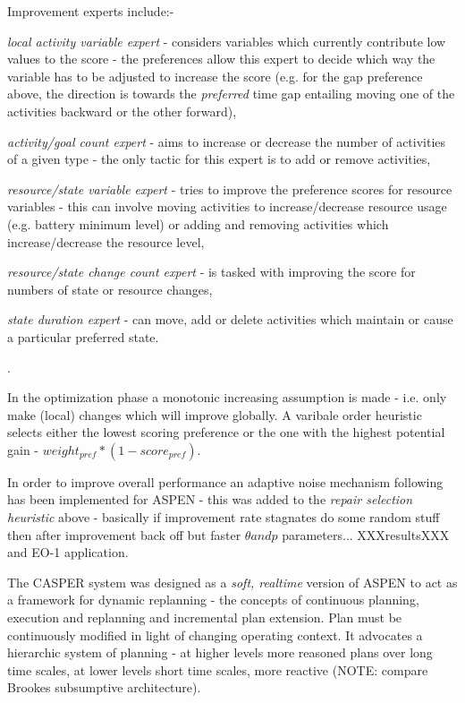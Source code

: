 Improvement experts include:- \begin{inparaenum} \item \emph{local activity variable expert} - considers variables which currently contribute low values to the score - the preferences allow this expert to decide which way the variable has to be adjusted to increase the score (e.g. for the gap preference above, the direction is towards the \emph{preferred} time gap entailing moving one of the activities backward or the other forward), \item \emph{activity/goal count expert} - aims to increase or decrease the number of activities of a given type - the only tactic for this expert is to add or remove activities, \item \emph{resource/state variable expert} - tries to improve the preference scores for resource variables - this can involve moving activities to increase/decrease resource usage (e.g. battery minimum level) or adding and removing activities which increase/decrease the resource level, \item \emph{resource/state change count expert} - is tasked with improving the score for numbers of state or resource changes, \item \emph{state duration expert} - can move, add or delete activities which maintain or cause a particular preferred state. \end{inparaenum}.

In the optimization phase a monotonic increasing assumption is made - i.e. only make (local) changes which will improve globally. A varibale order heuristic selects either the lowest scoring preference or the one with the highest potential gain - $weight_{pref}*(1 - score_{pref})$.

In order to improve overall performance an adaptive noise mechanism following \cite{hoos02adaptive} has been implemented for ASPEN \cite{fukunaga04robust} - this was added to the \emph{repair selection heuristic} above - basically if improvement rate stagnates do some random stuff then after improvement back off but faster $\theta and p$ parameters... XXXresultsXXX and EO-1 application.

The CASPER system \cite{chien99iterative, chien00aspen} was designed as a \emph{soft, realtime} version of ASPEN to act as a framework for dynamic replanning - the concepts of continuous planning, execution and replanning and incremental plan extension. Plan must be continuously modified in light of changing operating context. It advocates a hierarchic system of planning - at higher levels more reasoned plans over long time scales, at lower levels short time scales, more reactive (NOTE: compare Brookes subsumptive architecture).

